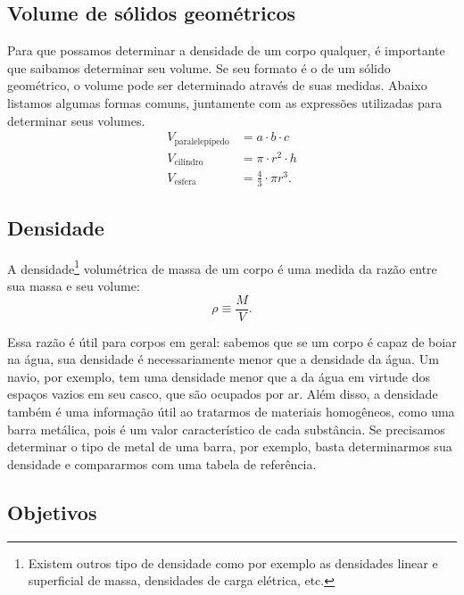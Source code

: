 \subsection{Volume de sólidos geométricos}

Para que possamos determinar a densidade de um corpo qualquer, é importante que saibamos determinar seu volume. Se seu formato é o de um sólido geométrico, o volume pode ser determinado através de suas medidas. Abaixo listamos algumas formas comuns, juntamente com as expressões utilizadas para determinar seus volumes.
\begin{align}
    V_{\text{paralelepípedo}} &= a \cdot b \cdot c \\
    V_{\text{cilindro}} &= \pi \cdot r^2 \cdot h \\
    V_{\text{esfera}} &= \frac{4}{3} \cdot \pi r^3.
\end{align}

\subsection{Densidade}

A densidade\footnote{Existem outros tipo de densidade como por exemplo as densidades linear e superficial de massa, densidades de carga elétrica, etc.} volumétrica de massa de um corpo é uma medida da razão entre sua massa e seu volume:
\begin{equation}
    \rho \equiv \frac{M}{V}.
\end{equation}

Essa razão é útil para corpos em geral: sabemos que se um corpo é capaz de boiar na água, sua densidade é necessariamente menor que a densidade da água. Um navio, por exemplo, tem uma densidade menor que a da água em virtude dos espaços vazios em seu casco, que são ocupados por ar. Além disso, a densidade também é uma informação útil ao tratarmos de materiais homogêneos, como uma barra metálica, pois é um valor característico de cada substância. Se precisamos determinar o tipo de metal de uma barra, por exemplo, basta determinarmos sua densidade e compararmos com uma tabela de referência.

\subsection{Objetivos}

